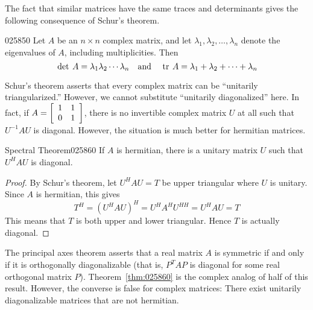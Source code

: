 The fact that similar matrices have the same traces and determinants gives the following consequence of Schur's theorem.


\begin{corollary}{}{025850}
Let $A$ be an $n \times n$ complex matrix, and let $\lambda_{1}, \lambda_{2}, \dots, \lambda_{n}$ denote the eigenvalues of $A$, including multiplicities. Then
\begin{equation*}
\thinspace\operatorname{det \medspace}A = \lambda_1\lambda_2 \cdots \lambda_n \quad \mbox{and} \quad \thinspace\operatorname{tr \medspace}A = \lambda_1 + \lambda_2 + \cdots + \lambda_n 
\end{equation*}
\end{corollary}

Schur's theorem asserts that every 
complex matrix can be ``unitarily triangularized.'' However, we cannot 
substitute ``unitarily diagonalized'' here. In fact, if $A = \left[ \begin{array}{cc}
1 & 1 \\
0 & 1
\end{array}\right]$, there is no invertible complex matrix $U$ at all such that $U^{-1}AU$ is diagonal. However, the situation is much better for hermitian matrices.


\begin{theorem}{Spectral Theorem}{025860}
If $A$ is hermitian, there is a unitary matrix $U$ such that $U^{H}AU$ is diagonal.
\end{theorem}

\begin{proof}
By Schur's theorem, let $U^{H}AU = T$ be upper triangular where $U$ is unitary. Since $A$ is hermitian, this gives
\begin{equation*}
T^H = (U^HAU)^H = U^HA^HU^{HH} = U^HAU = T
\end{equation*}
This means that $T$ is both upper and lower triangular. Hence $T$ is actually diagonal.
\end{proof}

The principal axes theorem asserts that a real matrix $A$ is symmetric if and only if it is orthogonally diagonalizable (that is, $P^{T}AP$ is diagonal for some real orthogonal matrix $P$). Theorem~\ref{thm:025860}
 is the complex analog of half of this result. However, the converse is 
false for complex matrices: There exist unitarily diagonalizable 
matrices that are not hermitian.


